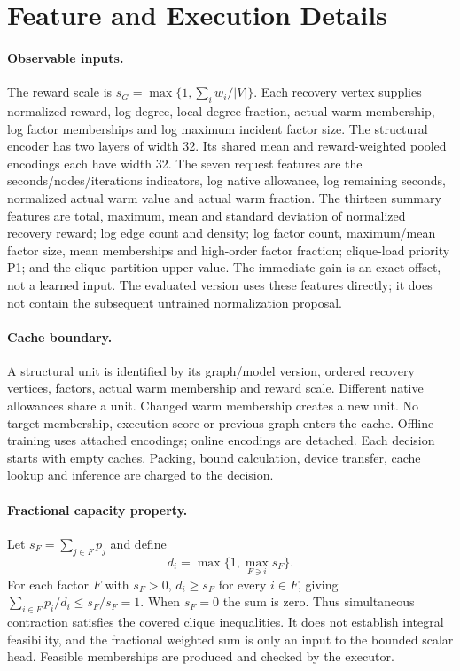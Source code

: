 \section{Feature and Execution Details}
\paragraph{Observable inputs.}
The reward scale is $s_G=\max\{1,\sum_i w_i/|V|\}$.
Each recovery vertex supplies normalized reward, log degree, local degree
fraction, actual warm membership, log factor memberships and log maximum
incident factor size. The structural encoder has two layers of width 32.
Its shared mean and reward-weighted pooled encodings each have width 32.
The seven request features are the seconds/nodes/iterations indicators,
log native allowance, log remaining seconds, normalized actual warm value
and actual warm fraction. The thirteen summary features are total,
maximum, mean and standard deviation of normalized recovery reward;
log edge count and density; log factor count, maximum/mean factor size,
mean memberships and high-order factor fraction; clique-load priority P1;
and the clique-partition upper value. The immediate gain is an exact offset,
not a learned input. The evaluated version uses these features directly;
it does not contain the subsequent untrained normalization proposal.

\paragraph{Cache boundary.}
A structural unit is identified by its graph/model version, ordered recovery
vertices, factors, actual warm membership and reward scale. Different native
allowances share a unit. Changed warm membership creates a new unit.
No target membership, execution score or previous graph enters the cache.
Offline training uses attached encodings; online encodings are detached.
Each decision starts with empty caches. Packing, bound calculation, device
transfer, cache lookup and inference are charged to the decision.

\paragraph{Fractional capacity property.}
Let $s_F=\sum_{j\in F}p_j$ and define
\[
d_i=\max\{1,\max_{F\ni i}s_F\}.
\]
For each factor $F$ with $s_F>0$,
$d_i\geq s_F$ for every $i\in F$, giving
$\sum_{i\in F}p_i/d_i\leq s_F/s_F=1$. When $s_F=0$ the sum is zero.
Thus simultaneous contraction satisfies the covered clique inequalities.
It does not establish integral feasibility, and the fractional weighted sum
is only an input to the bounded scalar head. Feasible memberships are
produced and checked by the executor.

